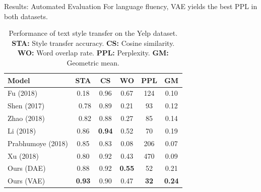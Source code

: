 \documentclass[final]{beamer}
\newlength{\onecolwid}
\newlength{\twocolwid}
\begin{document}
\begin{frame}[t]
\begin{columns}[t]
\begin{column}{\twocolwid}
\begin{columns}[t,totalwidth=\twocolwid]
\begin{column}{\onecolwid}
\begin{block}{Results: Automated Evaluation}
                        For language fluency, VAE yields the best PPL in both datasets.

                        \begin{table}[ht]
                            \centering
                            \begin{tabular}{l c c c c c}
                                \textbf{Model}    & \textbf{STA}     & \textbf{CS}       & \textbf{WO}       & \textbf{PPL}     & \textbf{GM}       \\
                                \hline
                                Fu (2018)         & \color{gray}0.18 & \color{gray} 0.96 & \color{gray} 0.67 & \color{gray} 124 & \color{gray} 0.10 \\
                                Shen (2017)       & \ 0.78           & 0.89              & 0.21              & 93               & 0.12              \\
                                Zhao (2018)       & \ 0.82           & 0.88              & 0.27              & 85               & 0.14              \\
                                Li (2018)         & 0.86             & \textbf{0.94}     & 0.52              & 70               & 0.19              \\
                                Prabhumoye (2018) & 0.85             & 0.83              & 0.08              & 206              & 0.07              \\
                                Xu (2018)         & 0.80             & 0.92              & 0.43              & 470              & 0.09              \\
                                Ours (DAE)        & 0.88             & 0.92              & \textbf{0.55}     & 52               & 0.21              \\
                                Ours (VAE)        & \textbf{0.93}    & 0.90              & 0.47              & \textbf{32}      & \textbf{0.24}     \\
                            \end{tabular}
                            \caption{Performance of text style transfer on the Yelp dataset. \textbf{STA:} Style transfer accuracy. \textbf{CS:} Cosine similarity. \textbf{WO:} Word overlap rate. \textbf{PPL:} Perplexity. \textbf{GM:} Geometric mean.}
                            \label{tab:comparison-previous}
                        \end{table}



\end{block}
\end{column}
\end{columns}
\end{column}
\end{columns}
\end{frame}
\end{document}
